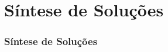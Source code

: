 \section[Síntese de Soluções]{Síntese de Soluções}
\begin{frame}
\frametitle{Síntese de Soluções}
\end{frame}
